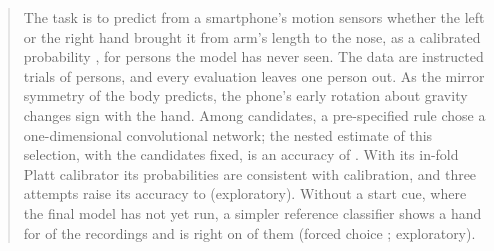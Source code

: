 \begin{abstract}
\noindent The task is to predict from a smartphone's motion sensors whether the left or the right hand brought it
from arm's length to the nose, as a calibrated probability \pright{}, for persons the model has never seen. The data
are  instructed trials of  persons, and every evaluation leaves one
person out. As the mirror symmetry of the body predicts, the phone's early rotation about gravity changes sign with
the hand. Among  candidates, a pre-specified rule chose a one-dimensional convolutional network;
the nested estimate of this selection, with the candidates fixed, is an accuracy of . With
its in-fold Platt calibrator its probabilities are consistent with calibration, and three attempts raise its accuracy
to  (exploratory). Without a start cue, where the final model has not yet run, a simpler
reference classifier shows a hand for  of the recordings and is right on
 of them (forced choice ; exploratory).
\end{abstract}

